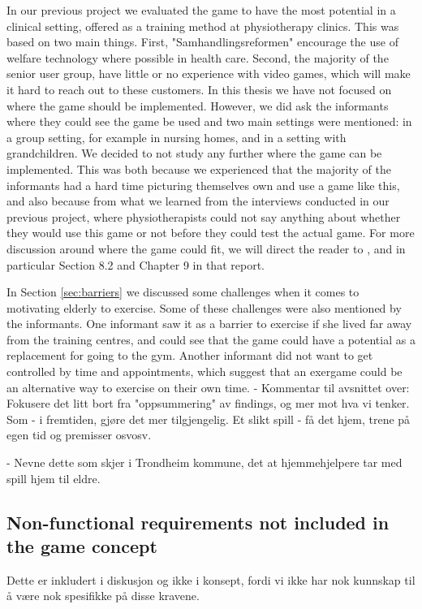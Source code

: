 In our previous project \cite{project} we evaluated the game to have the most potential in a clinical setting, offered as a training method at physiotherapy clinics. This was based on two main things. First, "Samhandlingsreformen" encourage the use of welfare technology where possible in health care. Second, the majority of the senior user group, have little or no experience with video games, which will make it hard to reach out to these customers. In this thesis we have not focused on where the game should be implemented. However, we did ask the informants where they could see the game be used and two main settings were mentioned: in a group setting, for example in nursing homes, and in a setting with grandchildren. We decided to not study any further where the game can be implemented. This was both because we experienced that the majority of the informants had a hard time picturing themselves own and use a game like this, and also because from what we learned from the interviews conducted in our previous project, where physiotherapists could not say anything about whether they would use this game or not before they could test the actual game. For more discussion around where the game could fit, we will direct the reader to \cite{project}, and in particular Section 8.2 and Chapter 9 in that report. 

In Section \ref{sec:barriers} we discussed some challenges when it comes to motivating elderly to exercise. Some of these challenges were also mentioned by the informants. One informant saw it as a barrier to exercise if she lived far away from the training centres, and could see that the game could have a potential as a replacement for going to the gym. Another informant did not want to get controlled by time and appointments, which suggest that an exergame could be an alternative way to exercise on their own time. 
- Kommentar til avsnittet over: Fokusere det litt bort fra "oppsummering" av findings, og mer mot hva vi tenker. Som - i fremtiden, gjøre det mer tilgjengelig. Et slikt spill - få det hjem, trene på egen tid og premisser osvosv. 


- Nevne dette som skjer i Trondheim kommune, det at hjemmehjelpere tar med spill hjem til eldre. 

\subsection{Non-functional requirements not included in the game concept}

Dette er inkludert i diskusjon og ikke i konsept, fordi vi ikke har nok kunnskap til å være nok spesifikke på disse kravene. 

